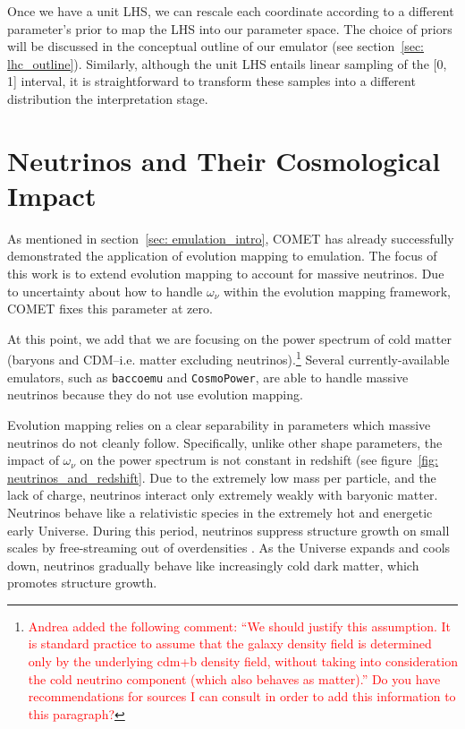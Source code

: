Once we have a unit LHS, we can rescale each coordinate according to a 
different parameter's prior to map the LHS into our parameter space. The
choice of priors will be discussed in the conceptual outline of our
emulator (see section~\ref{sec: lhc_outline}). Similarly,
although the unit LHS entails linear sampling of the [0, 1] interval, it is 
straightforward to transform these samples into a different distribution
the interpretation stage.

\section{Neutrinos and Their Cosmological Impact}
\label{sec: neutrino_problem}

As mentioned in section~\ref{sec: emulation_intro}, COMET has already 
successfully demonstrated the application of evolution mapping to emulation. 
The focus of this work is to extend evolution mapping to account for 
massive neutrinos. Due to uncertainty about how to handle $\omega_\nu$ within 
the evolution mapping framework, COMET fixes this parameter at zero.

At this point, we add that we are focusing on the power spectrum of cold
matter (baryons and CDM--i.e. matter excluding
neutrinos).\footnote{\textcolor{red}{Andrea 
added the following comment: ``We should 
justify this assumption. It is standard practice to assume that the galaxy 
density field is determined only by the underlying cdm+b density field, 
without taking into consideration the cold neutrino component (which also 
behaves as matter).'' Do you have recommendations for sources I can consult in
order to add this information to this paragraph?}} Several currently-available 
emulators, such as \verb|baccoemu| and \verb|CosmoPower|, are able to handle 
massive neutrinos because they do not use evolution mapping.

Evolution mapping relies on a clear separability in parameters which massive 
neutrinos do not cleanly follow. Specifically, unlike other shape parameters, 
the impact of $\omega_\nu$ on the power spectrum is not constant in redshift
(see figure~\ref{fig: neutrinos_and_redshift}.
Due to the extremely low mass per particle, and the lack of charge, neutrinos
interact only extremely weakly with baryonic matter. Neutrinos behave like a 
relativistic species in the extremely hot and energetic early Universe.
During this period, neutrinos suppress structure growth on small scales by
free-streaming out of overdensities . As the Universe expands 
and cools down, neutrinos gradually behave like increasingly cold dark matter,
which promotes structure growth.

